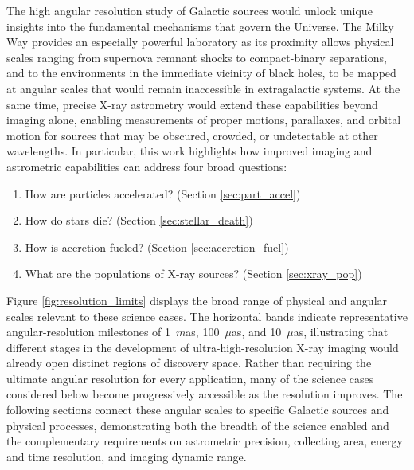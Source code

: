 \documentclass{article}
\begin{document}
The high angular resolution study of Galactic sources would unlock unique insights into the fundamental mechanisms that govern the Universe. The Milky Way provides an especially powerful laboratory as its proximity allows physical scales ranging from supernova remnant shocks to compact-binary separations, and to the environments in the immediate vicinity of black holes, to be mapped at angular scales that would remain inaccessible in extragalactic systems. At the same time, precise X-ray astrometry would extend these capabilities beyond imaging alone, enabling measurements of proper motions, parallaxes, and orbital motion for sources that may be obscured, crowded, or undetectable at other wavelengths. In particular, this work highlights how improved imaging and astrometric capabilities can address four broad questions:

\begin{enumerate}
\item How are particles accelerated? (Section \ref{sec:part_accel})
\item How do stars die? (Section \ref{sec:stellar_death})
\item How is accretion fueled? (Section \ref{sec:accretion_fuel})
\item What are the populations of X-ray sources? (Section \ref{sec:xray_pop})
\end{enumerate}

Figure \ref{fig:resolution_limits} displays the broad range of physical and angular scales relevant to these science cases. The horizontal bands indicate representative angular-resolution milestones of 1~$m$as, 100~$\mu$as, and 10~$\mu$as, illustrating that different stages in the development of ultra-high-resolution X-ray imaging would already open distinct regions of discovery space. Rather than requiring the ultimate angular resolution for every application, many of the science cases considered below become progressively accessible as the resolution improves. The following sections connect these angular scales to specific Galactic sources and physical processes, demonstrating both the breadth of the science enabled and the complementary requirements on astrometric precision, collecting area, energy and time resolution, and imaging dynamic range.
\end{document}
